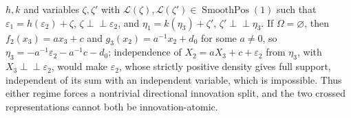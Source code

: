 \(h,k\) and variables \(\zeta,\zeta'\) with \(\mathcal L(\zeta),\mathcal L(\zeta')\in\operatorname{SmoothPos}(1)\) such that \(\varepsilon_1=h(\varepsilon_2)+\zeta\), \(\zeta\perp\!\!\!\perp\varepsilon_2\), and \(\eta_1=k(\eta_3)+\zeta'\), \(\zeta'\perp\!\!\!\perp\eta_3\). If \(\Omega=\varnothing\), then \(f_2(x_3)=ax_3+c\) and \(g_3(x_2)=a^{-1}x_2+d_0\) for some \(a\neq0\), so \(\eta_3=-a^{-1}\varepsilon_2-a^{-1}c-d_0\); independence of \(X_2=aX_3+c+\varepsilon_2\) from \(\eta_3\), with \(X_3\perp\!\!\!\perp\varepsilon_2\), would make \(\varepsilon_2\), whose strictly positive density gives full support, independent of its sum with an independent variable, which is impossible. Thus either regime forces a nontrivial directional innovation split, and the two crossed representations cannot both be innovation-atomic.